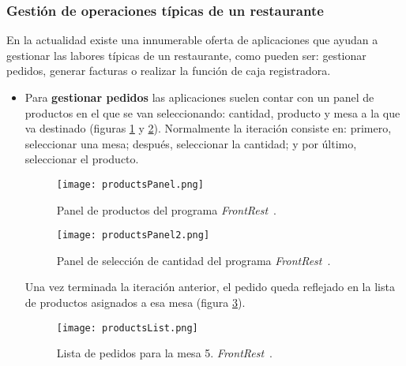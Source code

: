     \subsubsection{Gestión de operaciones típicas de un restaurante}
    En la actualidad existe una innumerable oferta de aplicaciones que ayudan
    a gestionar las labores típicas de un restaurante, como pueden ser:
    gestionar pedidos, generar facturas o realizar la función de caja 
    registradora.

    \begin{itemize}
    \item Para \textbf{gestionar pedidos} las aplicaciones suelen contar con 
    un panel de productos en el que se van seleccionando: cantidad, producto y 
    mesa a la que va destinado (figuras \ref{fig:productsPanel} y
    \ref{fig:productsPanel2}). Normalmente la iteración consiste en: primero,
    seleccionar una mesa; después, seleccionar la cantidad; y por último,
    seleccionar el producto.

    \begin{figure}[!h]
      \begin{center}
        \texttt{[image: productsPanel.png]}
        \caption{Panel de productos del programa
        \emph{FrontRest}~\cite{bib:frontRest}.}
        \label{fig:productsPanel}
      \end{center}
    \end{figure}

    \begin{figure}[!h]
      \begin{center}
        \texttt{[image: productsPanel2.png]}
        \caption{Panel de selección de cantidad del programa
        \emph{FrontRest}~\cite{bib:frontRest}.}
        \label{fig:productsPanel2}
      \end{center}
    \end{figure}

    Una vez terminada la iteración anterior, el pedido queda reflejado en la
    lista de productos asignados a esa mesa (figura \ref{fig:productsList}).

    \begin{figure}[!h]
      \begin{center}
        \texttt{[image: productsList.png]}
        \caption{Lista de pedidos para la mesa 5.
        \emph{FrontRest}~\cite{bib:frontRest}.}
        \label{fig:productsList}
      \end{center}
    \end{figure}


\end{itemize}
